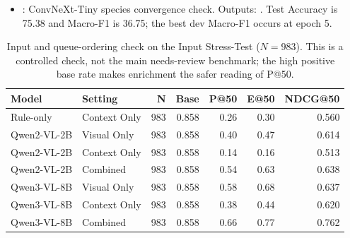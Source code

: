 \documentclass{article}
\begin{document}
\begin{itemize}
\item {}: ConvNeXt-Tiny species convergence check. Outputs: . Test Accuracy is 75.38 and Macro-F1 is 36.75; the best dev Macro-F1 occurs at epoch 5.
\end{itemize}

\begin{table}[h]
\centering
\caption{Input and queue-ordering check on the Input Stress-Test ($N=983$). This is a controlled check, not the main needs-review benchmark; the high positive base rate makes enrichment the safer reading of P@50.}
\label{tab:strict983}
\small
\begin{tabular}{llrrrrr}
\toprule
Model & Setting & N & Base & P@50 & E@50 & NDCG@50 \\
\midrule
Rule-only & Context Only & 983 & 0.858 & 0.26 & 0.30 & 0.560 \\
Qwen2-VL-2B & Visual Only & 983 & 0.858 & 0.40 & 0.47 & 0.614 \\
Qwen2-VL-2B & Context Only & 983 & 0.858 & 0.14 & 0.16 & 0.513 \\
Qwen2-VL-2B & Combined & 983 & 0.858 & 0.54 & 0.63 & 0.638 \\
Qwen3-VL-8B & Visual Only & 983 & 0.858 & 0.58 & 0.68 & 0.637 \\
Qwen3-VL-8B & Context Only & 983 & 0.858 & 0.38 & 0.44 & 0.620 \\
Qwen3-VL-8B & Combined & 983 & 0.858 & 0.66 & 0.77 & 0.762 \\
\bottomrule
\end{tabular}
\end{table}
\end{document}
